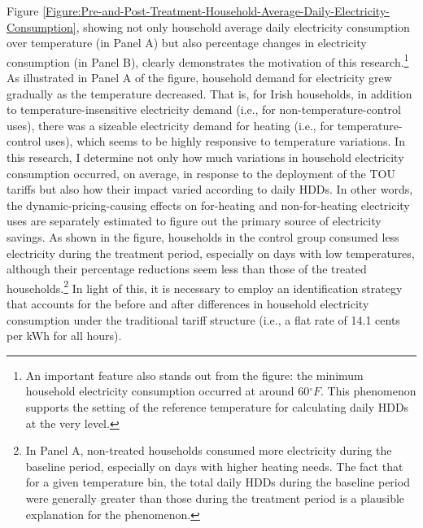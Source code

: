 Figure \ref{Figure:Pre-and-Post-Treatment-Household-Average-Daily-Electricity-Consumption}, showing not only household average daily electricity consumption over temperature (in Panel A) but also percentage changes in electricity consumption (in Panel B), clearly demonstrates the motivation of this research.\footnote{An important feature also stands out from the figure: the minimum household electricity consumption occurred at around 60$^{\circ}F$. This phenomenon supports the setting of the reference temperature for calculating daily HDDs at the very level.} As illustrated in Panel A of the figure, household demand for electricity grew gradually as the temperature decreased. That is, for Irish households, in addition to temperature-insensitive electricity demand (i.e., for non-temperature-control uses), there was a sizeable electricity demand for heating (i.e., for temperature-control uses), which seems to be highly responsive to temperature variations. In this research, I determine not only how much variations in household electricity consumption occurred, on average, in response to the deployment of the TOU tariffs but also how their impact varied according to daily HDDs. In other words, the dynamic-pricing-causing effects on for-heating and non-for-heating electricity uses are separately estimated to figure out the primary source of electricity savings. As shown in the figure, households in the control group consumed less electricity during the treatment period, especially on days with low temperatures, although their percentage reductions seem less than those of the treated households.\footnote{In Panel A, non-treated households consumed more electricity during the baseline period, especially on days with higher heating needs. The fact that for a given temperature bin, the total daily HDDs during the baseline period were generally greater than those during the treatment period is a plausible explanation for the phenomenon.} In light of this, it is necessary to employ an identification strategy that accounts for the before and after differences in household electricity consumption under the traditional tariff structure (i.e., a flat rate of 14.1 cents per kWh for all hours).
